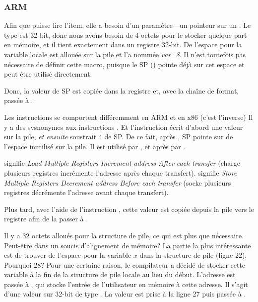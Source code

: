 \subsubsection{ARM}

\myparagraph{\OptimizingKeilVI (\ThumbMode)}



\myindex{\CLanguageElements!\Pointers}

Afin que \scanf puisse lire l'item, elle a besoin d'un paramètre---un pointeur sur un \Tint.
Le type \Tint est 32-bit, donc nous avons besoin de 4 octets pour le stocker quelque
part en mémoire, et il tient exactement dans un registre 32-bit.
De l'espace pour la variable locale  est allouée sur la pile et \IDA l'a
nommée \emph{var\_8}. Il n'est toutefois pas nécessaire de définir cette macro, puisque
le \ac{SP} () pointe déjà sur cet espace et
peut être utilisé directement.

Donc, la valeur de \ac{SP} est copiée dans la registre  et, avec la chaîne
de format, passée à \scanf.

Les instructions  se comportent différemment en ARM et en x86 (c'est l'inverse)
Il y a des sysnonymes aux instructions .
Et l'instruction  écrit d'abord une valeur sur la pile, \emph{et ensuite}
soustrait 4 de \ac{SP}.
De ce fait, après , \ac{SP} pointe sur de l'espace inutilisé sur la pile.
Il est utilisé par \scanf, et après par \printf.

 signifie \emph{Load Multiple Registers Increment address After each transfer}
(charge plusieurs registres incrémente l'adresse après chaque transfert).
 signifie \emph{Store Multiple Registers Decrement address Before each transfer}
(socke plusieurs registres décrémente l'adresse avant chaque transfert).

Plus tard, avec l'aide de l'instruction , cette valeur est copiée depuis
la pile vers le registre  afin de la passer à \printf.




Il y a 32 octets alloués pour la structure de pile, ce qui est plus que nécessaire.
Peut-être dans un soucis d'alignement de mémoire?
La partie la plus intéressante est de trouver de l'espace pour la variable $x$ dans
la structure de pile (ligne 22).
Pourquoi 28? Pour une certaine raison, le compilateur a décidé de stocker cette
variable à la fin de la structure de pile locale au lieu du début.
L'adresse est passée à \scanf, qui stocke l'entrée de l'utilisateur en mémoire à
cette adresse.
Il s'agit d'une valeur sur 32-bit de type \Tint.
La valeur est prise à la ligne 27 puis passée à \printf.


